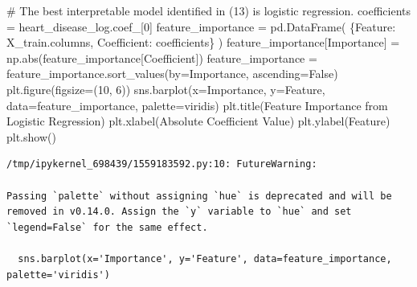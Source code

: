 \documentclass[
  11pt,
  letterpaper,
  DIV=11,
  numbers=noendperiod]{scrartcl}
\newenvironment{Shaded}{\begin{snugshade}}{\end{snugshade}}
\newcommand{\BuiltInTok}[1]{\textcolor[rgb]{0.00,0.23,0.31}{#1}}
\newcommand{\CommentTok}[1]{\textcolor[rgb]{0.37,0.37,0.37}{#1}}
\newcommand{\DecValTok}[1]{\textcolor[rgb]{0.68,0.00,0.00}{#1}}
\newcommand{\NormalTok}[1]{\textcolor[rgb]{0.00,0.23,0.31}{#1}}
\newcommand{\OperatorTok}[1]{\textcolor[rgb]{0.37,0.37,0.37}{#1}}
\newcommand{\StringTok}[1]{\textcolor[rgb]{0.13,0.47,0.30}{#1}}
\newcommand{\VariableTok}[1]{\textcolor[rgb]{0.07,0.07,0.07}{#1}}
\begin{document}
\begin{Shaded}
\begin{Highlighting}[]
\CommentTok{\# The best interpretable model identified in (13) is logistic regression.}
\NormalTok{coefficients }\OperatorTok{=}\NormalTok{ heart\_disease\_log.coef\_[}\DecValTok{0}\NormalTok{]}
\NormalTok{feature\_importance }\OperatorTok{=}\NormalTok{ pd.DataFrame(}
\NormalTok{    \{}\StringTok{\textquotesingle{}Feature\textquotesingle{}}\NormalTok{: X\_train.columns,}
     \StringTok{\textquotesingle{}Coefficient\textquotesingle{}}\NormalTok{: coefficients\}}
\NormalTok{)}
\NormalTok{feature\_importance[}\StringTok{\textquotesingle{}Importance\textquotesingle{}}\NormalTok{] }\OperatorTok{=}\NormalTok{ np.}\BuiltInTok{abs}\NormalTok{(feature\_importance[}\StringTok{\textquotesingle{}Coefficient\textquotesingle{}}\NormalTok{])}
\NormalTok{feature\_importance }\OperatorTok{=}\NormalTok{ feature\_importance.sort\_values(by}\OperatorTok{=}\StringTok{\textquotesingle{}Importance\textquotesingle{}}\NormalTok{, ascending}\OperatorTok{=}\VariableTok{False}\NormalTok{)}
\NormalTok{plt.figure(figsize}\OperatorTok{=}\NormalTok{(}\DecValTok{10}\NormalTok{, }\DecValTok{6}\NormalTok{))}
\NormalTok{sns.barplot(x}\OperatorTok{=}\StringTok{\textquotesingle{}Importance\textquotesingle{}}\NormalTok{, y}\OperatorTok{=}\StringTok{\textquotesingle{}Feature\textquotesingle{}}\NormalTok{, data}\OperatorTok{=}\NormalTok{feature\_importance, palette}\OperatorTok{=}\StringTok{\textquotesingle{}viridis\textquotesingle{}}\NormalTok{)}
\NormalTok{plt.title(}\StringTok{\textquotesingle{}Feature Importance from Logistic Regression\textquotesingle{}}\NormalTok{)}
\NormalTok{plt.xlabel(}\StringTok{\textquotesingle{}Absolute Coefficient Value\textquotesingle{}}\NormalTok{)}
\NormalTok{plt.ylabel(}\StringTok{\textquotesingle{}Feature\textquotesingle{}}\NormalTok{)}
\NormalTok{plt.show()}
\end{Highlighting}
\end{Shaded}

\begin{verbatim}
/tmp/ipykernel_698439/1559183592.py:10: FutureWarning: 

Passing `palette` without assigning `hue` is deprecated and will be removed in v0.14.0. Assign the `y` variable to `hue` and set `legend=False` for the same effect.

  sns.barplot(x='Importance', y='Feature', data=feature_importance, palette='viridis')
\end{verbatim}
\end{document}
